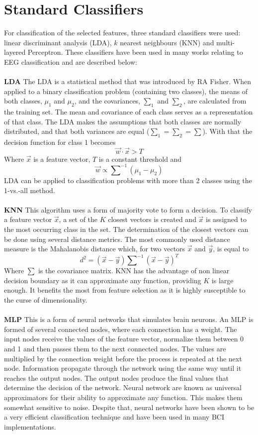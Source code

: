 \documentclass[12pt, a4paper, fleqn]{memoir}%
\begin{document}
\section{Standard Classifiers}
\label{sec:StandardClassifiers}
For classification of the selected features, three standard classifiers were used: linear discriminant analysis (LDA), $k$ nearest neighbours (KNN) and multi-layered Perceptron. These classifiers have been used in many works relating to EEG classification and are described below:\\
\\
\textbf{LDA} The LDA is a statistical method that was introduced by RA Fisher\cite{fisher1936use}. When applied to a binary classification problem (containing two classes), the means of both classes, $\mu_1$ and $\mu_2$, and the covariances, $\sum_1$ and $\sum_2$, are calculated from the training set. The mean and covariance of each class serves as a representation of that class. The LDA makes the assumptions that both classes are normally distributed, and that both variances are equal ($\sum_1 = \sum_2 = \sum$). With that the decision function for class 1 becomes 
$$\vec{w} \cdot \vec{x} > T $$
Where $\vec{x}$ is a feature vector, $T$ is a constant threshold and 
$$\vec{w} \propto \sum\nolimits^{-1}(\mu_1 - \mu_2)$$
LDA can be applied to classification problems with more than 2 classes using the 1-vs.-all method\cite{hunterberger2003brain}.\\
\\
\textbf{KNN} This algorithm uses a form of majority vote to form a decision. To classify a feature vector $\vec{x}$, a set of the $K$ closest vectors is created and $\vec{x}$ is assigned to the most occurring class in the set. The determination of the closest vectors can be done using several distance metrics. The most commonly used distance measure is the Mahalanobis distance which, for two vectors $\vec{x}$ and $\vec{y}$, is equal to
$$d^2 = (\vec{x} - \vec{y})\sum\nolimits^{-1}(\vec{x} - \vec{y})^{T}$$
Where $\sum$ is the covariance matrix. KNN has the advantage of non linear decision boundary as it can approximate any function, providing $K$ is large enough. It benefits the most from feature selection as it is highly susceptible to the curse of dimensionality\cite{lotte2007review}.\\
\\
\textbf{MLP} This is a form of neural networks that simulates brain neurons. An MLP is formed of several connected nodes, where each connection has a weight. The input nodes receive the values of the feature vector, normalize them between 0 and 1 and then passes them to the next connected nodes. The values are multiplied by the connection weight before the process is repeated at the next node. Information propagate through the network using the same way until it reaches the output nodes. The output nodes produce the final values that determine the decision of the network. Neural network are known as universal approximators for their ability to approximate any function. This makes them somewhat sensitive to noise. Despite that, neural networks have been shown to be a very efficient classification technique and have been used in many BCI implementations.\\
\end{document}
